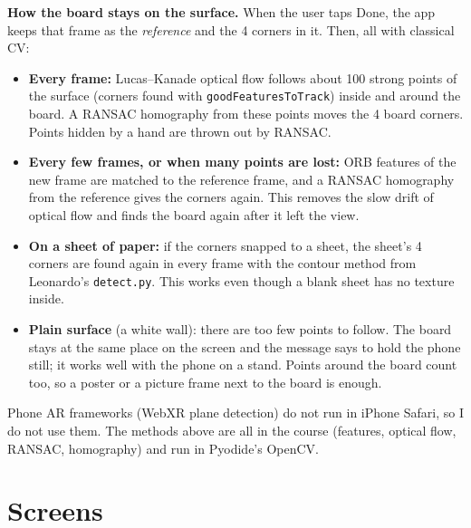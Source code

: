 \documentclass[11pt]{article}
\begin{document}
\textbf{How the board stays on the surface.} When the user taps Done, the app keeps that frame
as the \emph{reference} and the 4 corners in it. Then, all with classical CV:
\begin{itemize}
  \item \textbf{Every frame:} Lucas--Kanade optical flow follows about 100 strong points of the
        surface (corners found with \texttt{goodFeaturesToTrack}) inside and around the board. A
        RANSAC homography from these points moves the 4 board corners. Points hidden by a hand
        are thrown out by RANSAC.
  \item \textbf{Every few frames, or when many points are lost:} ORB features of the new frame
        are matched to the reference frame, and a RANSAC homography from the reference gives the
        corners again. This removes the slow drift of optical flow and finds the board again after
        it left the view.
  \item \textbf{On a sheet of paper:} if the corners snapped to a sheet, the sheet's 4 corners are
        found again in every frame with the contour method from Leonardo's \texttt{detect.py}. This
        works even though a blank sheet has no texture inside.
  \item \textbf{Plain surface} (a white wall): there are too few points to follow. The board stays
        at the same place on the screen and the message says to hold the phone still; it works
        well with the phone on a stand. Points around the board count too, so a poster or a
        picture frame next to the board is enough.
\end{itemize}
Phone AR frameworks (WebXR plane detection) do not run in iPhone Safari, so I do not use them. The
methods above are all in the course (features, optical flow, RANSAC, homography) and run in
Pyodide's OpenCV.

\section{Screens}
\end{document}
